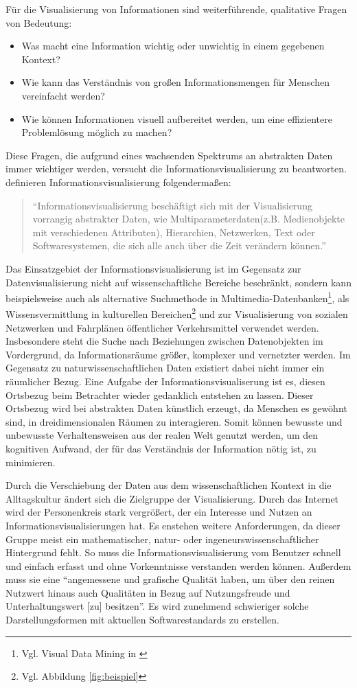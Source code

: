 \documentclass[a4paper, 12pt, DIV=calc, version=first, pdftex, headsepline, footsepline, bibtotocnumbered, liststotocnumbered]{scrreprt}
\begin{document}
Für die Visualisierung von Informationen sind weiterführende, qualitative Fragen von Bedeutung:
\begin{itemize}
\item Was macht eine Information wichtig oder unwichtig in einem gegebenen Kontext?
\item Wie kann das Verständnis von großen Informationsmengen für Menschen vereinfacht werden?
\item Wie können Informationen visuell aufbereitet werden, um eine effizientere Problemlösung möglich zu machen?
\end{itemize}
Diese Fragen, die aufgrund eines wachsenden Spektrums an abstrakten Daten immer wichtiger werden,
versucht die Informationsvisualisierung zu beantworten.
\citep[S.\,434]{Preim} definieren Informationsvisualisierung folgendermaßen:
\begin{quote}
"`Informationsvisualisierung beschäftigt sich mit der Visualisierung vorrangig abstrakter Daten, wie
Multiparameterdaten(z.B. Medienobjekte mit verschiedenen Attributen), Hierarchien, Netzwerken, Text
oder Softwaresystemen, die sich alle auch über die Zeit verändern können."'
\end{quote}
Das Einsatzgebiet der Informationsvisualisierung ist im Gegensatz zur Datenvisualisierung nicht
auf wissenschaftliche Bereiche beschränkt,
sondern kann beispielsweise auch als alternative Suchmethode in Multimedia-Datenbanken\footnote{Vgl. Visual Data Mining in \citep{Keim}},
als Wissensvermittlung in kulturellen Bereichen\footnote{Vgl. Abbildung \ref{fig:beispiel}} und zur Visualisierung von
sozialen Netzwerken und Fahrplänen öffentlicher Verkehrsmittel verwendet werden.
Insbesondere steht die Suche nach Beziehungen zwischen Datenobjekten im Vordergrund,
da Informationsräume größer, komplexer und vernetzter werden. Im Gegensatz
zu naturwissenschaftlichen Daten existiert dabei nicht immer ein räumlicher Bezug.
Eine Aufgabe der Informationsvisualiserung ist es, diesen Ortsbezug beim Betrachter wieder gedanklich
entstehen zu lassen. Dieser Ortsbezug wird bei abstrakten Daten künstlich erzeugt, da
Menschen es gewöhnt sind, in dreidimensionalen Räumen zu interagieren.
Somit können bewusste und unbewusste Verhaltensweisen aus der realen Welt genutzt werden, um den
kognitiven Aufwand, der für das Verständnis der Information nötig ist, zu minimieren.

Durch die Verschiebung der Daten aus dem wissenschaftlichen Kontext
in die Alltagskultur ändert sich die Zielgruppe der Visualisierung. Durch das Internet
wird der Personenkreis stark vergrößert, der ein Interesse und Nutzen an Informationsvisualisierungen
hat. Es enstehen weitere Anforderungen, da dieser Gruppe meist ein mathematischer, natur- oder ingeneurswissenschaftlicher Hintergrund
fehlt. So muss die Informationsvisualisierung vom Benutzer
schnell und einfach erfasst und ohne Vorkenntnisse verstanden werden können.
Außerdem muss sie eine "`angemessene und grafische Qualität haben, um über den
reinen Nutzwert hinaus auch Qualitäten in Bezug auf Nutzungsfreude und Unterhaltungswert [zu] besitzen"'\citep[S.\,438]{Preim}.
Es wird zunehmend schwieriger solche Darstellungsformen mit aktuellen Softwarestandards zu erstellen.
\end{document}
